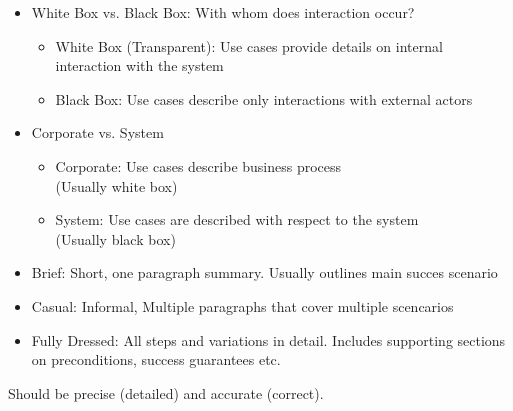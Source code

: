 \documentclass[
../../Software_Engineering_Summary.tex,
]
{subfiles}
\begin{document}
\begin{defbox}
    \begin{itemize}
        \item White Box vs. Black Box: With whom does interaction occur?
        \begin{itemize}
            \item White Box (Transparent): Use cases provide details on internal interaction with the system
            \item Black Box: Use cases describe only interactions with external actors 
        \end{itemize}
        \item Corporate vs. System
        \begin{itemize}
            \item Corporate: Use cases describe business process\\ (Usually white box)
            \item System: Use cases are described with respect to the system \\ (Usually black box)
        \end{itemize}
    \end{itemize}
\end{defbox}

\begin{defbox}
    \begin{itemize}
        \item Brief: Short, one paragraph summary. Usually outlines main succes scenario
        \item Casual: Informal, Multiple paragraphs that cover multiple scencarios
        \item Fully Dressed: All steps and variations in detail. Includes supporting sections on preconditions, success guarantees etc.
    \end{itemize}
    Should be precise (detailed) and accurate (correct).
\end{defbox}
\end{document}
